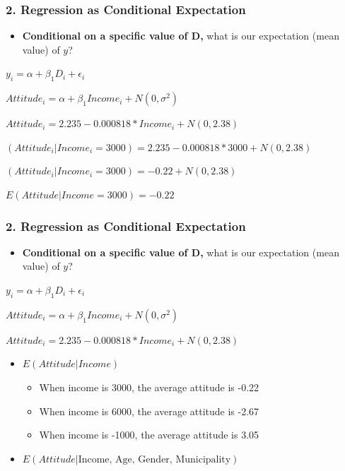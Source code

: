 \documentclass[xcolor=x11names,compress]{beamer}\usepackage[]{graphicx}\usepackage[]{color}
\renewcommand{\(}{\begin{columns}}
\renewcommand{\)}{\end{columns}}
\newcommand{\<}[1]{\begin{column}{#1}}
\renewcommand{\>}{\end{column}}
\begin{document}
\begin{frame}
\frametitle{2. Regression as Conditional Expectation}
\begin{itemize}
\item \textbf{Conditional on a specific value of D,} what is our expectation (mean value) of $y$?
\end{itemize}
\small
\begin{center}
\item $y_i = \alpha + \beta_1 D_i + \epsilon_i$ \\
\pause
\item $Attitude_i = \alpha + \beta_1 Income_i + N(0,\sigma^2)$ \\
\pause
\item $Attitude_i = 2.235 - 0.000818 * Income_i + N(0,2.38)$ \\
\pause
\item $(Attitude_i | Income_i=3000) = 2.235 - 0.000818 * 3000 + N(0,2.38)$ \\
\pause
\item $(Attitude_i | Income_i=3000) = -0.22 + N(0,2.38)$ \\
\pause
\item $E(Attitude | Income=3000) = -0.22$
\end{center}
\normalsize
\end{frame}

\begin{frame}
\frametitle{2. Regression as Conditional Expectation}
\begin{itemize}
\item \textbf{Conditional on a specific value of D,} what is our expectation (mean value) of $y$?
\end{itemize}
\small
\begin{center}
\item $y_i = \alpha + \beta_1 D_i + \epsilon_i$
\item $Attitude_i = \alpha + \beta_1 Income_i + N(0,\sigma^2)$
\item $Attitude_i = 2.235 - 0.000818 * Income_i + N(0,2.38)$
\end{center}
\normalsize
\pause
\begin{itemize}
\item $E(Attitude | Income)$
\begin{itemize}
\item When income is 3000, the average attitude is -0.22
\pause
\item When income  is 6000, the average attitude is -2.67
\pause
\item When income  is -1000, the average attitude is 3.05
\end{itemize}
\pause
\item $E(Attitude|\text{Income, Age, Gender, Municipality})$
\end{itemize}
\end{frame}
\end{document}
